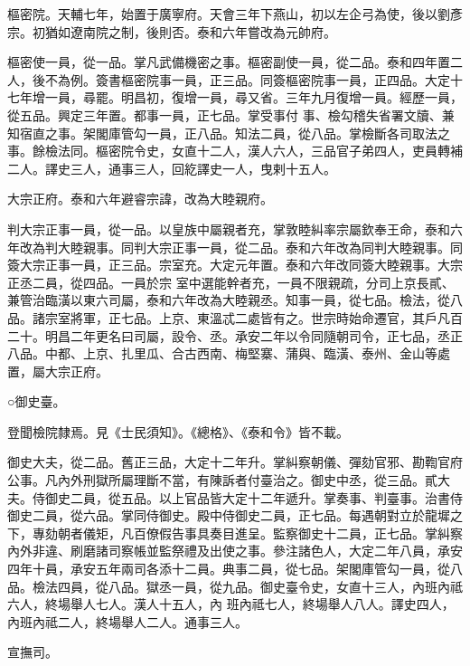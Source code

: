 \begin{pinyinscope}
 樞密院。天輔七年，始置于廣寧府。天會三年下燕山，初以左企弓為使，後以劉彥宗。初猶如遼南院之制，後則否。泰和六年嘗改為元帥府。



 樞密使一員，從一品。掌凡武備機密之事。樞密副使一員，從二品。泰和四年置二人，後不為例。簽書樞密院事一員，正三品。同簽樞密院事一員，正四品。大定十七年增一員，尋罷。明昌初，復增一員，尋又省。三年九月復增一員。經歷一員，從五品。興定三年置。都事一員，正七品。掌受事付
 事、檢勾稽失省署文牘、兼知宿直之事。架閣庫管勾一員，正八品。知法二員，從八品。掌檢斷各司取法之事。餘檢法同。樞密院令史，女直十二人，漢人六人，三品官子弟四人，吏員轉補二人。譯史三人，通事三人，回紇譯史一人，曳剌十五人。



 大宗正府。泰和六年避睿宗諱，改為大睦親府。



 判大宗正事一員，從一品。以皇族中屬親者充，掌敦睦糾率宗屬欽奉王命，泰和六年改為判大睦親事。同判大宗正事一員，從二品。泰和六年改為同判大睦親事。同簽大宗正事一員，正三品。宗室充。大定元年置。泰和六年改同簽大睦親事。大宗正丞二員，從四品。一員於宗
 室中選能幹者充，一員不限親疏，分司上京長貳、兼管治臨潢以東六司屬，泰和六年改為大睦親丞。知事一員，從七品。檢法，從八品。諸宗室將軍，正七品。上京、東溫忒二處皆有之。世宗時始命遷官，其戶凡百二十。明昌二年更名曰司屬，設令、丞。承安二年以令同隨朝司令，正七品，丞正八品。中都、上京、扎里瓜、合古西南、梅堅寨、蒲與、臨潢、泰州、金山等處置，屬大宗正府。



 ○御史臺。



 登聞檢院隸焉。見《士民須知》。《總格》、《泰和令》皆不載。



 御史大夫，從二品。舊正三品，大定十二年升。掌糾察朝儀、彈劾官邪、勘鞫官府
 公事。凡內外刑獄所屬理斷不當，有陳訴者付臺治之。御史中丞，從三品。貳大夫。侍御史二員，從五品。以上官品皆大定十二年遞升。掌奏事、判臺事。治書侍御史二員，從六品。掌同侍御史。殿中侍御史二員，正七品。每遇朝對立於龍墀之下，專劾朝者儀矩，凡百僚假告事具奏目進呈。監察御史十二員，正七品。掌糾察內外非違、刷磨諸司察帳並監祭禮及出使之事。參注諸色人，大定二年八員，承安四年十員，承安五年兩司各添十二員。典事二員，從七品。架閣庫管勾一員，從八品。檢法四員，從八品。獄丞一員，從九品。御史臺令史，女直十三人，內班內祗六人，終場舉人七人。漢人十五人，內
 班內祗七人，終場舉人八人。譯史四人，內班內祗二人，終場舉人二人。通事三人。



 宣撫司。




\end{pinyinscope}
